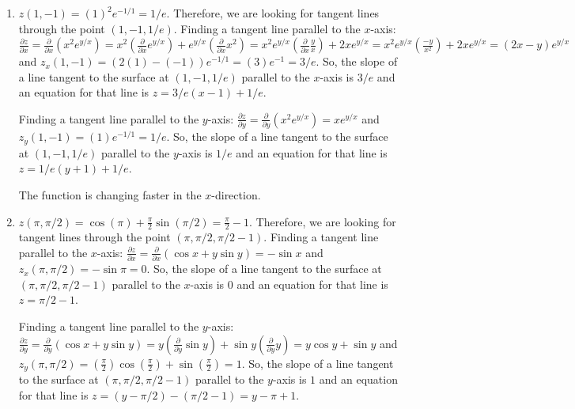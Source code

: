 \begin{Answer}[ref = tangent]
\begin{enumerate}
    \item $z(1, -1) = (1)^2e^{-1/1} = 1/e$. Therefore, we are looking for 
    tangent lines through the point $(1, -1, 1/e)$. Finding a tangent line 
    parallel to the $x$-axis: $\frac{\partial z}{\partial x} = \frac{\partial}{
    \partial x} \left( x^2e^{y/x} \right) = x^2 \left( \frac{\partial}{\partial
    x}e^{y/x} \right) + e^{y/x} \left( \frac{\partial}{\partial x}x^2 \right) =
    x^2e^{y/x} \left( \frac{\partial}{\partial x} \frac{y}{x} \right) + 2x
    e^{y/x} = x^2 e^{y/x} \left( \frac{-y}{x^2} \right) + 2xe^{y/x} = \left( 
    2x - y \right)e^{y/x}$ and $z_x(1, -1) = \left( 2(1) - (-1) \right) 
    e^{-1/1} = \left(3 \right)e^{-1} = 3/e$. So, the slope of a line tangent to 
    the surface at $(1, -1, 1/e)$ parallel to the $x$-axis is $3/e$ and an 
    equation for that line is $z = 3/e \left(x - 1 \right) + 1/e$. 

    Finding a tangent line parallel to the $y$-axis: $\frac{\partial z}{
    \partial y} = \frac{\partial}{\partial y} \left( x^2e^{y/x} \right) = x
    e^{y/x}$ and $z_y(1, -1) = (1)e^{-1/1} = 1/e$. So, the slope of a line 
    tangent to the surface at $(1, -1, 1/e)$ parallel to the $y$-axis is $1/e$ 
    and an equation for that line is $z = 1/e \left(y + 1 \right) + 1/e$. 

    The function is changing faster in the $x$-direction. 

    \item $z(\pi, \pi/2) = \cos{(\pi)} + \frac{\pi}{2}\sin{(\pi/2)} = \frac{
    \pi}{2} - 1 $. Therefore, we are looking for tangent lines through the 
    point $(\pi, \pi/2, \pi/2 - 1)$. Finding a tangent line parallel to the 
    $x$-axis: $\frac{\partial z}{\partial x} = \frac{\partial}{\partial x} 
    \left( \cos{x} + y\sin{y} \right) = -\sin{x}$ and $z_x(\pi, \pi/2) = -\sin{
    \pi} = 0$. So, the slope of a line tangent to the surface at $(\pi, \pi/2, 
    \pi/2 - 1)$ parallel to the $x$-axis is $0$ and an equation for that line 
    is $z = \pi/2 - 1$.

    Finding a tangent line parallel to the $y$-axis: $\frac{\partial z}{
    \partial y} = \frac{\partial}{\partial y} \left( \cos{x} + y\sin{y} \right)
    = y \left( \frac{\partial}{\partial y}\sin{y} \right) + \sin{y} \left( 
    \frac{\partial}{\partial y} y \right) = y\cos{y} + \sin{y}$ and $z_y(\pi, 
    \pi/2) = \left( \frac{\pi}{2} \right) \cos{ \left( \frac{\pi}{2} \right) } 
    + \sin{ \left( \frac{\pi}{2} \right) } = 1$. So, the slope of a line tangent
    to the surface at $( \pi, \pi/2, \pi/2 - 1 )$ parallel to the $y$-axis is 
    $1$ and an equation for that line is $z = \left( y - \pi/2 \right) - \left(
    \pi/2 - 1 \right) = y - \pi + 1$. 


\end{enumerate}
\end{Answer}
